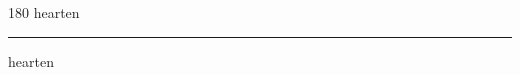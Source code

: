 
\begin{frame}
\begin{center}
\begin{turn}{180}
{\fontsize{2.5cm}{1em}\selectfont hearten}
\end{turn}
\vspace{1em}\par  
\hrule
\vspace{1em}\par  
{\fontsize{2.5cm}{1em}\selectfont hearten}
\end{center}
\end{frame}
